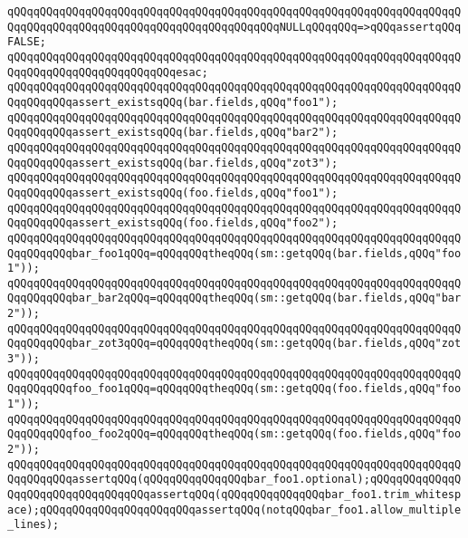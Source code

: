 \verb|qQQqqQQqqQQqqQQqqQQqqQQqqQQqqQQqqQQqqQQqqQQqqQQqqQQqqQQqqQQqqQQqqQQqqQQqqQQqqQQqqQQqqQQqqQQqqQQqqQQqqQQqqQQqqQQqNULLqQQqqQQq=>qQQqassertqQQqFALSE;|\newline
\verb|qQQqqQQqqQQqqQQqqQQqqQQqqQQqqQQqqQQqqQQqqQQqqQQqqQQqqQQqqQQqqQQqqQQqqQQqqQQqqQQqqQQqqQQqqQQqqQQqesac;|\newline
\newline
\verb|qQQqqQQqqQQqqQQqqQQqqQQqqQQqqQQqqQQqqQQqqQQqqQQqqQQqqQQqqQQqqQQqqQQqqQQqqQQqqQQqassert_existsqQQq(bar.fields,qQQq"foo1");|\newline
\verb|qQQqqQQqqQQqqQQqqQQqqQQqqQQqqQQqqQQqqQQqqQQqqQQqqQQqqQQqqQQqqQQqqQQqqQQqqQQqqQQqassert_existsqQQq(bar.fields,qQQq"bar2");|\newline
\verb|qQQqqQQqqQQqqQQqqQQqqQQqqQQqqQQqqQQqqQQqqQQqqQQqqQQqqQQqqQQqqQQqqQQqqQQqqQQqqQQqassert_existsqQQq(bar.fields,qQQq"zot3");|\newline
\newline
\verb|qQQqqQQqqQQqqQQqqQQqqQQqqQQqqQQqqQQqqQQqqQQqqQQqqQQqqQQqqQQqqQQqqQQqqQQqqQQqqQQqassert_existsqQQq(foo.fields,qQQq"foo1");|\newline
\verb|qQQqqQQqqQQqqQQqqQQqqQQqqQQqqQQqqQQqqQQqqQQqqQQqqQQqqQQqqQQqqQQqqQQqqQQqqQQqqQQqassert_existsqQQq(foo.fields,qQQq"foo2");|\newline
\newline
\verb|qQQqqQQqqQQqqQQqqQQqqQQqqQQqqQQqqQQqqQQqqQQqqQQqqQQqqQQqqQQqqQQqqQQqqQQqqQQqqQQqbar_foo1qQQq=qQQqqQQqtheqQQq(sm::getqQQq(bar.fields,qQQq"foo1"));|\newline
\verb|qQQqqQQqqQQqqQQqqQQqqQQqqQQqqQQqqQQqqQQqqQQqqQQqqQQqqQQqqQQqqQQqqQQqqQQqqQQqqQQqbar_bar2qQQq=qQQqqQQqtheqQQq(sm::getqQQq(bar.fields,qQQq"bar2"));|\newline
\verb|qQQqqQQqqQQqqQQqqQQqqQQqqQQqqQQqqQQqqQQqqQQqqQQqqQQqqQQqqQQqqQQqqQQqqQQqqQQqqQQqbar_zot3qQQq=qQQqqQQqtheqQQq(sm::getqQQq(bar.fields,qQQq"zot3"));|\newline
\newline
\verb|qQQqqQQqqQQqqQQqqQQqqQQqqQQqqQQqqQQqqQQqqQQqqQQqqQQqqQQqqQQqqQQqqQQqqQQqqQQqqQQqfoo_foo1qQQq=qQQqqQQqtheqQQq(sm::getqQQq(foo.fields,qQQq"foo1"));|\newline
\verb|qQQqqQQqqQQqqQQqqQQqqQQqqQQqqQQqqQQqqQQqqQQqqQQqqQQqqQQqqQQqqQQqqQQqqQQqqQQqqQQqfoo_foo2qQQq=qQQqqQQqtheqQQq(sm::getqQQq(foo.fields,qQQq"foo2"));|\newline
\newline
\verb|qQQqqQQqqQQqqQQqqQQqqQQqqQQqqQQqqQQqqQQqqQQqqQQqqQQqqQQqqQQqqQQqqQQqqQQqqQQqqQQqassertqQQq(qQQqqQQqqQQqqQQqbar_foo1.optional);qQQqqQQqqQQqqQQqqQQqqQQqqQQqqQQqqQQqassertqQQq(qQQqqQQqqQQqqQQqbar_foo1.trim_whitespace);qQQqqQQqqQQqqQQqqQQqqQQqassertqQQq(notqQQqbar_foo1.allow_multiple_lines);|\newline
